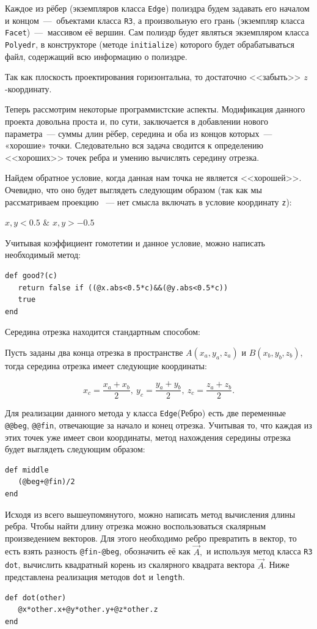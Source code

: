 Каждое из рёбер (экземпляров класса \verb|Edge|) полиэдра будем задавать его началом и концом~---  объектами класса \verb|R3|, а произвольную его грань (экземпляр класса \verb|Facet|)~---  массивом её вершин. Сам полиэдр будет являться экземпляром класса \verb|Polyedr|, в конструкторе (методе \verb|initialize|) которого будет обрабатываться файл, содержащий всю информацию о полиэдре.

Так как плоскость проектирования горизонтальна, то достаточно <<забыть>> $z$-координату.

Теперь рассмотрим некоторые программистские аспекты. Модификация данного проекта довольна проста и, по сути, заключается в добавлении нового параметра~---  суммы длин рёбер, середина и оба из концов которых~---  «хорошие» точки. Следовательно  вся задача сводится к определению <<хороших>> точек ребра и  умению вычислять середину отрезка.

Найдем обратное условие, когда данная нам точка не является  <<хорошей>>. Очевидно, что оно будет выглядеть  следующим образом (так как мы рассматриваем проекцию ~---  нет смысла включать в условие координату  \verb|z|):
\begin{center}
 $x,y < 0.5$ & $x,y > -0.5$
\end{center}

 
Учитывая коэффициент гомотетии и данное условие, можно написать необходимый метод:
\begin{lstlisting}
def good?(c)
   return false if ((@x.abs<0.5*c)&&(@y.abs<0.5*c))
   true
end
\end{lstlisting}

Середина отрезка находится стандартным способом:

Пусть заданы два конца отрезка в пространстве $A(x_a,y_a,z_a)$ и $B(x_b,y_b,z_b),$ тогда середина отрезка имеет следующие координаты:

 $$x_c = \frac {x_a+x_b}2, \ y_c = \frac {y_a+y_b}2, \ z_c = \frac {z_a+z_b}2.$$
 

Для реализации данного метода у класса  \verb|Edge|(Ребро) есть две переменные  \verb|@@beg|, \verb|@@fin|, отвечающие за начало и конец отрезка.  Учитывая то, что каждая из этих точек уже имеет свои координаты, метод нахождения середины отрезка будет выглядеть следующим образом:  

\begin{lstlisting}
def middle
   (@beg+@fin)/2
end
\end{lstlisting}

Исходя из всего вышеупомянутого, можно написать метод вычисления длины ребра. Чтобы найти длину отрезка можно воспользоваться скалярным произведением векторов. Для этого необходимо ребро превратить в вектор, то есть взять разность \verb|@fin-@beg|, обозначить её как  $\vec A,$  и используя метод класса  \verb|R3 dot|, вычислить квадратный  корень из скалярного квадрата вектора  $\vec A$.  Ниже представлена реализация методов \verb|dot|  и \verb|length|.
\begin{lstlisting}
def dot(other) 
   @x*other.x+@y*other.y+@z*other.z
end
\end{lstlisting}



